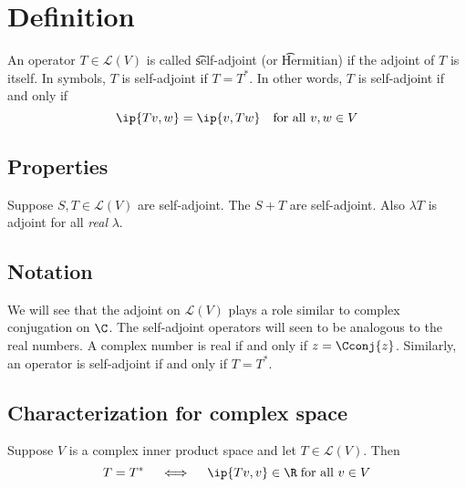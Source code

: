 
\section*{Definition}

An operator $T \in \mathcal{L} (V)$ is called \t{self-adjoint} (or \t{Hermitian}) if the adjoint of $T$ is itself.
In symbols, $T$ is self-adjoint if $T = T^*$.
In other words, $T$ is self-adjoint if and only if
\[
\ip{Tv, w} = \ip{v, Tw} \quad \text{for all } v, w \in V
\]

\subsection*{Properties}

\begin{proposition}
Suppose $S, T \in \mathcal{L} (V)$ are self-adjoint.
The $S + T$ are self-adjoint.
Also $\lambda T$ is adjoint for all \textit{real} $\lambda $.
\end{proposition}

\subsection*{Notation}

We will see that the adjoint on $\mathcal{L} (V)$ plays a role similar to complex conjugation on $\C $.
The self-adjoint operators will seen to be analogous to the real numbers.
A complex number is real if and only if $z = \Cconj{z}$.
Similarly, an operator is self-adjoint if and only if $T = T^*$.

\subsection*{Characterization for complex space}


\begin{proposition}
Suppose $V$ is a complex inner product space and let $T \in \mathcal{L} (V)$.
Then
\[
T = T^* \quad \iff \quad \ip{Tv, v} \in \R  \; \text{for all } v \in V
\]
\end{proposition}

\blankpage